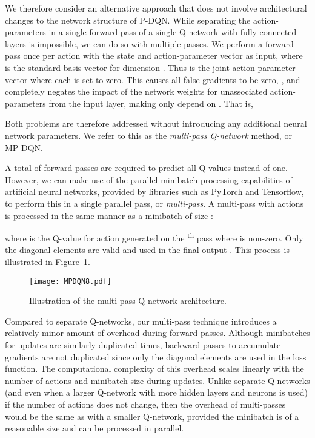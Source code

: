 \documentclass{article}
\def\PDQN*{P\nobreakdash-DQN}
\def\MPDQN*{MP\nobreakdash-DQN}
\begin{document}
We therefore consider an alternative approach that does not involve architectural changes to the network structure of \PDQN*. While separating the action-parameters in a single forward pass of a single Q-network with fully connected layers is impossible, we can do so with multiple passes. We perform a forward pass once per action  with the state  and action-parameter vector  as input, where  is the standard basis vector for dimension . Thus  is the joint action-parameter vector where each  is set to zero. This causes all false gradients to be zero, , and completely negates the impact of the network weights for unassociated action-parameters  from the input layer, making  only depend on . That is, 
 
Both  problems are therefore addressed without introducing any additional neural network parameters. We refer to this as the \emph{multi-pass Q-network} method, or \MPDQN*.

A total of  forward passes are required to predict all Q-values instead of one. However, we can make use of the parallel minibatch processing capabilities of artificial neural networks, provided by libraries such as PyTorch and Tensorflow, to perform this in a single parallel pass, or \emph{multi-pass}. A multi-pass with  actions is processed in the same manner as a minibatch of size :

where  is the Q-value for action  generated on the \textsuperscript{th} pass where  is non-zero. Only the diagonal elements  are valid and used in the final output . This process is illustrated in Figure~\ref{fig:mpdqn}.
\begin{figure}[ht]
	\centering
\texttt{[image: MPDQN8.pdf]}
	\caption{Illustration of the multi-pass Q-network architecture.}
	\label{fig:mpdqn}
\end{figure}

Compared to separate Q-networks, our multi-pass technique introduces a relatively minor amount of overhead during forward passes. Although minibatches for updates are similarly duplicated  times, backward passes to accumulate gradients are not duplicated since only the diagonal elements  are used in the loss function. The computational complexity of this overhead scales linearly with the number of actions and minibatch size during updates. Unlike separate Q-networks (and even when a larger Q-network with more hidden layers and neurons is used) if the number of actions does not change, then the overhead of multi-passes would be the same as with a smaller Q-network, provided the minibatch is of a reasonable size and can be processed in parallel.
\end{document}
